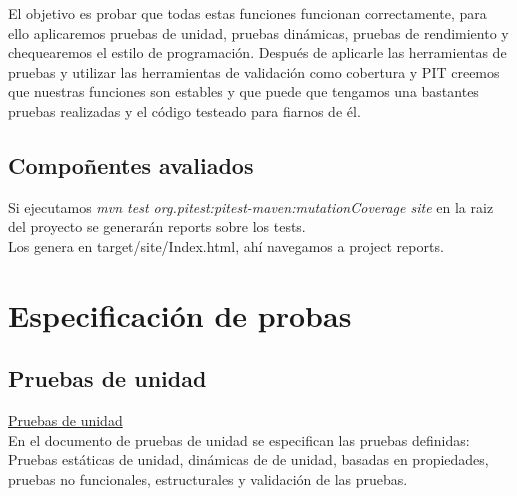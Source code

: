 \documentclass[DIV=calc,paper=a4,fontsize=11pt,onecolumn]{scrartcl} %
\begin{document}
	El objetivo es probar que todas estas funciones funcionan correctamente, para ello aplicaremos pruebas de unidad, pruebas dinámicas, pruebas de rendimiento y chequearemos el estilo de programación.
	Después de aplicarle las herramientas de pruebas y utilizar las herramientas de validación como cobertura y PIT creemos que nuestras funciones son estables y que puede que tengamos una bastantes pruebas realizadas y el código testeado para fiarnos de él. 

\subsection{Compoñentes avaliados}

Si ejecutamos \textit{mvn test org.pitest:pitest-maven:mutationCoverage site} en la raiz del proyecto se generarán reports sobre los tests. \\

Los genera en target/site/Index.html, ahí navegamos a project reports. \\

\section{Especificación de probas}

\subsection{Pruebas de unidad}
\href{Informes/documentoUnidad.txt}{Pruebas de unidad} \\
En el documento de pruebas de unidad se especifican las pruebas definidas:
Pruebas estáticas de unidad, dinámicas de de unidad, basadas en propiedades, pruebas no funcionales, estructurales y validación de las pruebas. 



\end{document}
